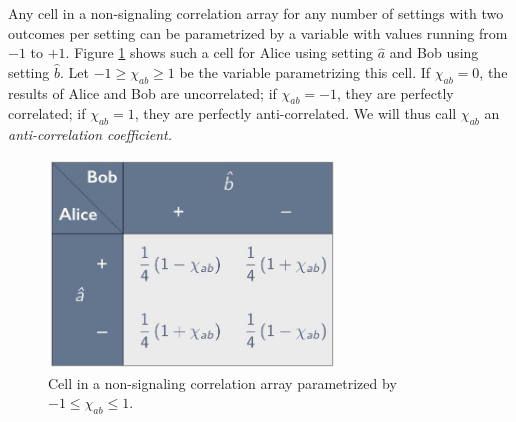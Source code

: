Any cell in a non-signaling correlation array for any number of settings with two outcomes per setting can be parametrized by a variable with values running from $-1$ to $+1$. Figure  \ref{CA-2set2out-cell} shows such a cell for Alice using setting $\hat{a}$ and Bob using setting $\hat{b}$. Let $-1 \ge \chi_{ab} \ge 1$ be the variable parametrizing this cell. If $\chi_{ab} = 0$, the results of Alice and Bob are uncorrelated; if $\chi_{ab} =-1$, they are perfectly correlated; if $\chi_{ab} =1$, they are perfectly anti-correlated. We will thus call $\chi_{ab}$ an \emph{anti-correlation coefficient.}
\begin{figure}[ht]
\centering
    \includegraphics[width=3in]{CA-2set2out-cell.jpeg}
 \caption{Cell in a non-signaling correlation array parametrized by $-1 \le \chi_{ab} \le 1$.}
   \label{CA-2set2out-cell}
\end{figure}

